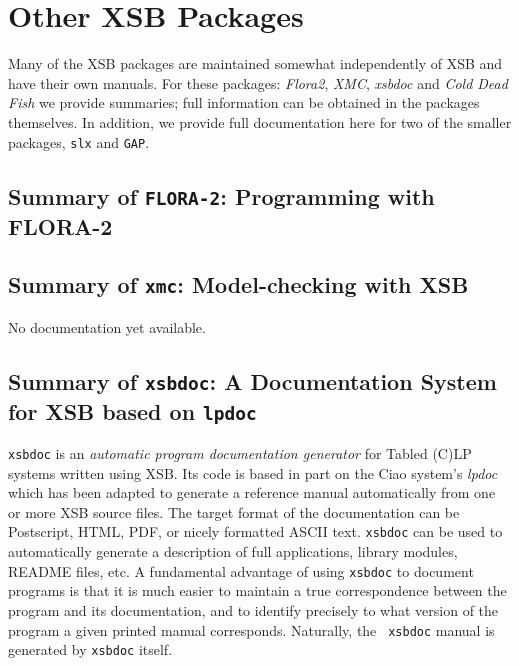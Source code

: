 \chapter{Other XSB Packages} \label{sec:otherpackages}

Many of the XSB packages are maintained somewhat independently of XSB
and have their own manuals.  For these packages: {\em Flora2}, {\em
  XMC}, {\em xsbdoc} and {\em Cold Dead Fish} we provide summaries;
full information can be obtained in the packages themselves.  In
addition, we provide full documentation here for two of the smaller
packages, {\tt slx} and {\tt GAP}.

\section{Summary of {\tt FLORA-2}: Programming with FLORA-2}
\label{package:flora2} 




\section{Summary of {\tt xmc}: Model-checking with XSB}
\label{package:xmc} 

No documentation yet available.

\section{Summary of {\tt xsbdoc}: A Documentation System for XSB based
on {\tt lpdoc}}
\label{package:xsbdoc} 

{\tt xsbdoc} is an {\em automatic program documentation generator} for
Tabled (C)LP systems written using XSB.  Its code is based in part on
the Ciao \cite{ciao-man} system's {\em lpdoc} which has been adapted
to generate a reference manual automatically from one or more XSB
source files.  The target format of the documentation can be
Postscript, HTML, PDF, or nicely formatted ASCII text.  {\tt xsbdoc}
can be used to automatically generate a description of full
applications, library modules, README files, etc.  A fundamental
advantage of using {\tt xsbdoc} to document programs is that it is
much easier to maintain a true correspondence between the program and
its documentation, and to identify precisely to what version of the
program a given printed manual corresponds.  Naturally, the {\tt
xsbdoc} manual is generated by {\tt xsbdoc} itself.


